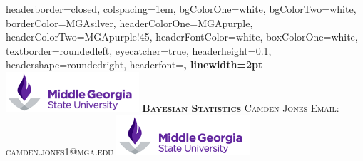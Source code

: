 \documentclass[landscape,a0paper,fontscale=0.285]{baposter} %
\begin{document}
\begin{poster}
{
headerborder=closed, %
colspacing=1em, %
bgColorOne=white, %
bgColorTwo=white, %
borderColor=MGAsilver, %
headerColorOne=MGApurple, %
headerColorTwo=MGApurple!45, %
headerFontColor=white, %
boxColorOne=white, %
textborder=roundedleft, %
eyecatcher=true, %
headerheight=0.1\textheight, %
headershape=roundedright, %
headerfont=\Large\bf\textsc, %
linewidth=2pt %
}
%
{\includegraphics[height=4em]{logo_purple.png}} %
{\bf\textsc{Bayesian Statistics}\vspace{0.5em}} %
{\textsc{Camden Jones \hspace{.4cm} Email: camden.jones1@mga.edu}} %
{\includegraphics[height=4em]{logo_purple.png}} %




\end{poster}
\end{document}
